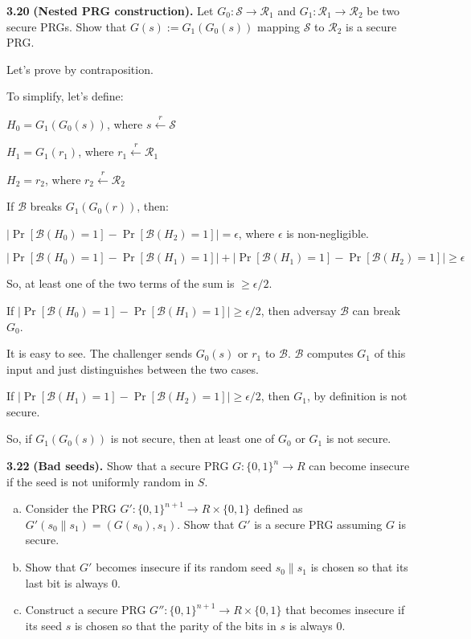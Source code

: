 \newpage
\noindent
\textbf{3.20}
\textbf{(Nested PRG construction).} Let $G_0 : \mathcal{S} \to \mathcal{R}_1$ and $G_1 : \mathcal{R}_1 \to \mathcal{R}_2$ be two secure PRGs.
Show that $G(s) := G_1 (G_0 (s))$ mapping $\mathcal{S}$ to $\mathcal{R}_2$ is a secure PRG.

\begin{tcolorbox}[solutionbox, title=Answer]

    Let's prove by contraposition.

    To simplify, let's define:

    $H_0 = G_1(G_0(s))$, where $s\stackrel{r}{\leftarrow}\mathcal{S}$

    $H_1 = G_1(r_1)$, where $r_1\stackrel{r}{\leftarrow}\mathcal{R}_1$

    $H_2 = r_2$, where $r_2\stackrel{r}{\leftarrow}\mathcal{R}_2$

    If $\mathcal{B}$ breaks $G_1(G_0(r))$, then:
    \vspace{1em}
    
    $|\Pr[\mathcal{B}(H_0) = 1] - \Pr[\mathcal{B}(H_2) = 1]| = \epsilon$, where $\epsilon$ is non-negligible.

    $|\Pr[\mathcal{B}(H_0) = 1] - \Pr[\mathcal{B}(H_1) = 1]| + |\Pr[\mathcal{B}(H_1) = 1] - \Pr[\mathcal{B}(H_2) = 1]| \ge \epsilon$

    So, at least one of the two terms of the sum is $\ge \epsilon/2$.
    \vspace{1em}

    If $|\Pr[\mathcal{B}(H_0) = 1] - \Pr[\mathcal{B}(H_1) = 1]| \ge \epsilon/2$, then adversay $\mathcal{B}$ can break $G_0$.

    It is easy to see. The challenger sends $G_0(s)$ or $r_1$ to $\mathcal{B}$. $\mathcal{B}$ computes $G_1$ of this input and just distinguishes between the two cases.
    \vspace{1em}

    If $|\Pr[\mathcal{B}(H_1) = 1] - \Pr[\mathcal{B}(H_2) = 1]| \ge \epsilon/2$, then $G_1$, by definition is not secure.

    So, if $G_1(G_0(s))$ is not secure, then at least one of $G_0$ or $G_1$ is not secure.

\end{tcolorbox}


\newpage
\noindent
\textbf{3.22}
\textbf{(Bad seeds).} Show that a secure PRG $G : \{0, 1\}^n \to R$ can become insecure if the seed is not uniformly random in $S$.

\begin{enumerate}[(a)]
\item Consider the PRG $G' : \{0, 1\}^{n+1} \to R \times \{0, 1\}$ defined as $G'(s_0 \| s_1) = (G(s_0), s_1)$. Show that $G'$ is a secure PRG assuming $G$ is secure.
\item Show that $G'$ becomes insecure if its random seed $s_0 \| s_1$ is chosen so that its last bit is always $0$.
\item Construct a secure PRG $G'' : \{0, 1\}^{n+1} \to R \times \{0, 1\}$ that becomes insecure if its seed $s$ is chosen so that the parity of the bits in $s$ is always $0$.
\end{enumerate}

